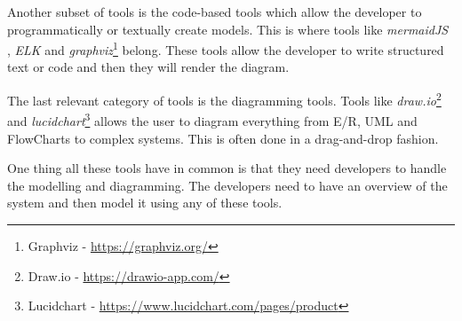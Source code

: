 Another subset of tools is the code-based tools which allow the developer to programmatically or textually create models. This is where tools like \emph{mermaidJS} \cite{mermaid}, \emph{ELK} \cite{ELK} and \emph{graphviz}\footnote{Graphviz - \url{https://graphviz.org/}} belong.
These tools allow the developer to write structured text or code and then they will render the diagram.

The last relevant category of tools is the diagramming tools. Tools like \emph{draw.io}\footnote{Draw.io - \url{https://drawio-app.com/}} and \emph{lucidchart}\footnote{Lucidchart - \url{https://www.lucidchart.com/pages/product}} allows the user to diagram everything from E/R, UML and FlowCharts to complex systems.
This is often done in a drag-and-drop fashion.

One thing all these tools have in common is that they need developers to handle the modelling and diagramming. The developers need to have an overview of the system and then model it using any of these tools.